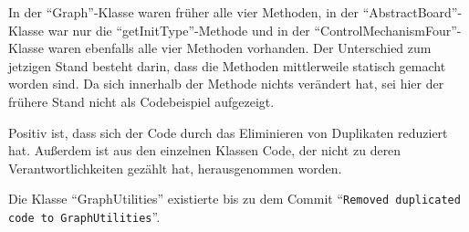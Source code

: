 \noindent In der \enquote{Graph}-Klasse waren früher alle vier Methoden, in der \enquote{AbstractBoard}-Klasse war nur die \enquote{getInitType}-Methode und in der \enquote{ControlMechanismFour}-Klasse waren ebenfalls alle vier Methoden vorhanden. Der Unterschied zum jetzigen Stand besteht darin, dass die Methoden mittlerweile statisch gemacht worden sind. Da sich innerhalb der Methode nichts verändert hat, sei hier der frühere Stand nicht als Codebeispiel aufgezeigt.

Positiv ist, dass sich der Code durch das Eliminieren von Duplikaten reduziert hat. Außerdem ist aus den einzelnen Klassen Code, der nicht zu deren Verantwortlichkeiten gezählt hat, herausgenommen worden. 

Die Klasse \enquote{GraphUtilities} existierte bis zu dem Commit \enquote{\texttt{Removed duplicated code to GraphUtilities}}.